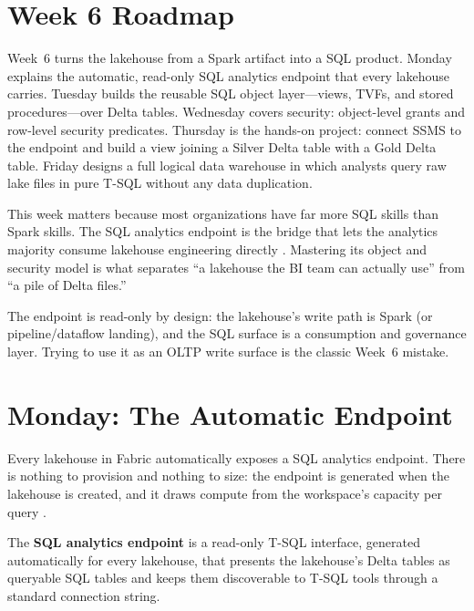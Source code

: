 \section{Week 6 Roadmap}
Week~6 turns the lakehouse from a Spark artifact into a SQL product. Monday explains the automatic, read-only SQL analytics endpoint that every lakehouse carries. Tuesday builds the reusable SQL object layer---views, TVFs, and stored procedures---over Delta tables. Wednesday covers security: object-level grants and row-level security predicates. Thursday is the hands-on project: connect SSMS to the endpoint and build a view joining a Silver Delta table with a Gold Delta table. Friday designs a full logical data warehouse in which analysts query raw lake files in pure T-SQL without any data duplication.

This week matters because most organizations have far more SQL skills than Spark skills. The SQL analytics endpoint is the bridge that lets the analytics majority consume lakehouse engineering directly \cite{microsoftFabricSqlEndpoint}. Mastering its object and security model is what separates ``a lakehouse the BI team can actually use'' from ``a pile of Delta files.''

\begin{notebox}
The endpoint is read-only by design: the lakehouse's write path is Spark (or pipeline/dataflow landing), and the SQL surface is a consumption and governance layer. Trying to use it as an OLTP write surface is the classic Week~6 mistake.
\end{notebox}

\section{Monday: The Automatic Endpoint}
Every lakehouse in Fabric automatically exposes a SQL analytics endpoint. There is nothing to provision and nothing to size: the endpoint is generated when the lakehouse is created, and it draws compute from the workspace's capacity per query \cite{microsoftFabricSqlEndpoint}.

\begin{definitionbox}
The \textbf{SQL analytics endpoint} is a read-only T-SQL interface, generated automatically for every lakehouse, that presents the lakehouse's Delta tables as queryable SQL tables and keeps them discoverable to T-SQL tools through a standard connection string.
\end{definitionbox}

